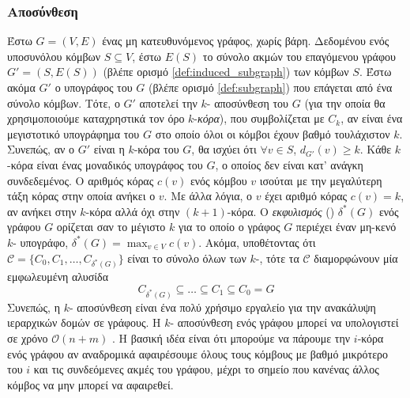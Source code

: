 \subsubsection{ Αποσύνθεση}
Έστω $G = (V,E)$ ένας μη κατευθυνόμενος γράφος, χωρίς βάρη.
Δεδομένου ενός υποσυνόλου κόμβων $S \subseteq V$, έστω $E(S)$ το σύνολο ακμών του επαγόμενου γράφου $G'=(S,E(S))$  (βλέπε  ορισμό \ref{def:induced_subgraph}) των κόμβων $S$.
Έστω ακόμα $G'$ ο υπογράφος του $G$ (βλέπε ορισμό \ref{def:subgraph}) που επάγεται από ένα σύνολο κόμβων.
Τότε, ο $G'$ αποτελεί την $k$- αποσύνθεση του $G$ (για την οποία θα χρησιμοποιούμε καταχρηστικά τον όρο $k$-\textit{κόρα}), που συμβολίζεται με $C_k$, αν είναι ένα μεγιστοτικό υπογράφημα του $G$ στο οποίο όλοι οι κόμβοι έχουν βαθμό τουλάχιστον $k$.
Συνεπώς, αν ο $G'$ είναι η $k$-κόρα του $G$, θα ισχύει ότι $\forall v \in S$, $d_{G'}(v) \geq k$.
Κάθε $k$-κόρα είναι ένας μοναδικός υπογράφος του $G$, ο οποίος δεν είναι κατ' ανάγκη συνδεδεμένος.
Ο αριθμός κόρας $c(v)$ ενός κόμβου $v$ ισούται με την μεγαλύτερη τάξη κόρας στην οποία ανήκει ο $v$.
Με άλλα λόγια, ο $v$ έχει αριθμό κόρας $c(v) = k$, αν ανήκει στην $k$-κόρα αλλά όχι στην $(k+1)$-κόρα.
Ο \textit{εκφυλισμός} () $\delta^*(G)$ ενός γράφου $G$ ορίζεται σαν το μέγιστο $k$ για το οποίο ο γράφος $G$ περιέχει έναν μη-κενό $k$- υπογράφο, $\delta^*(G) = \max_{v \in V}c(v)$.
Ακόμα, υποθέτοντας ότι $\mathcal{C} = \{  C_0, C_1, \ldots, C_{\delta^*(G)} \}$ είναι το σύνολο όλων των $k$-, τότε τα $\mathcal{C}$ διαμορφώνουν μία εμφωλευμένη αλυσίδα
\begin{equation}
    C_{\delta^*(G)} \subseteq \ldots \subseteq C_1 \subseteq C_0 = G
\end{equation}
Συνεπώς, η $k$- αποσύνθεση είναι ένα πολύ χρήσιμο εργαλείο για την ανακάλυψη ιεραρχικών δομών σε γράφους.
Η $k$- αποσύνθεση ενός γράφου μπορεί να υπολογιστεί σε χρόνο $\mathcal{O}(n+m)$ \cite{matula1983smallest,batagelj2011fast}.
Η βασική ιδέα είναι ότι μπορούμε να πάρουμε την $i$-κόρα ενός γράφου αν αναδρομικά αφαιρέσουμε όλους τους κόμβους με βαθμό μικρότερο του $i$ και τις συνδεόμενες ακμές του γράφου, μέχρι το σημείο που κανένας άλλος κόμβος να μην μπορεί να αφαιρεθεί.
